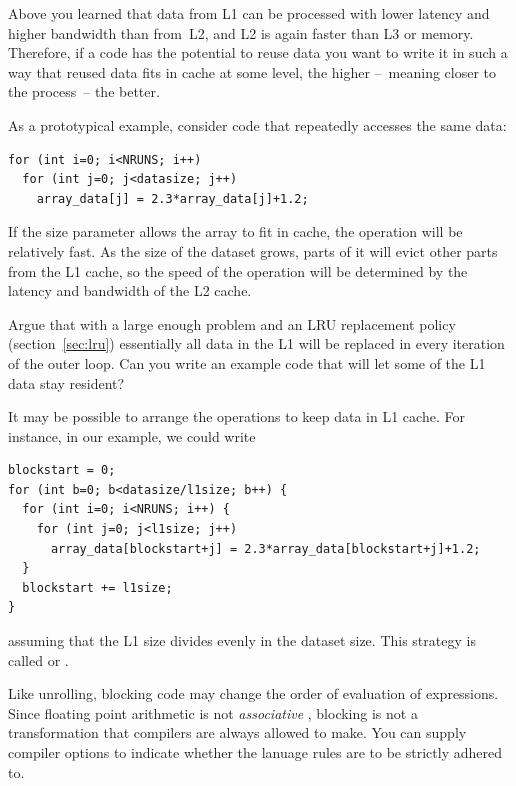 Above you learned that data from L1 can be processed with lower latency
and higher bandwidth than from~L2, and L2 is again faster than L3 or memory.
Therefore, if a code has the potential to reuse data
you want to write it in such a way that reused data fits in cache
at some level, the higher --~meaning closer to the process~-- the better.

As a prototypical example, consider code that repeatedly accesses the same data:
\begin{lstlisting}
for (int i=0; i<NRUNS; i++)
  for (int j=0; j<datasize; j++)
    array_data[j] = 2.3*array_data[j]+1.2;
\end{lstlisting}
If the size parameter allows the array to fit in cache, the operation
will be relatively fast. As the size of the dataset grows, parts of it
will evict other parts from the L1 cache, so the speed of the
operation will be determined by the latency and bandwidth of the L2
cache.

\begin{exercise}
  Argue that with a large enough problem and an \ac{LRU} replacement policy
  (section~\ref{sec:lru}) essentially all data in the L1 will be
  replaced in every iteration of the outer loop. Can you write an
  example code that will let some of the L1 data stay resident?
\end{exercise}

It may be possible to arrange the operations to keep data in L1 cache.
For instance, in our example, we could write
\begin{lstlisting}
blockstart = 0;
for (int b=0; b<datasize/l1size; b++) {
  for (int i=0; i<NRUNS; i++) {
    for (int j=0; j<l1size; j++)
      array_data[blockstart+j] = 2.3*array_data[blockstart+j]+1.2; 
  }
  blockstart += l1size;
}
\end{lstlisting}
assuming that the L1 size divides evenly in the dataset size.
This strategy is called  or
.

\begin{remark}
  Like unrolling, blocking code may change the order of evaluation of expressions.
  Since floating point arithmetic is not
  \emph{associative}%
  ,
  blocking is not a transformation that compilers are always allowed to make.
  You can supply compiler options to indicate whether the lanuage
  rules are to be strictly adhered to.
\end{remark}

